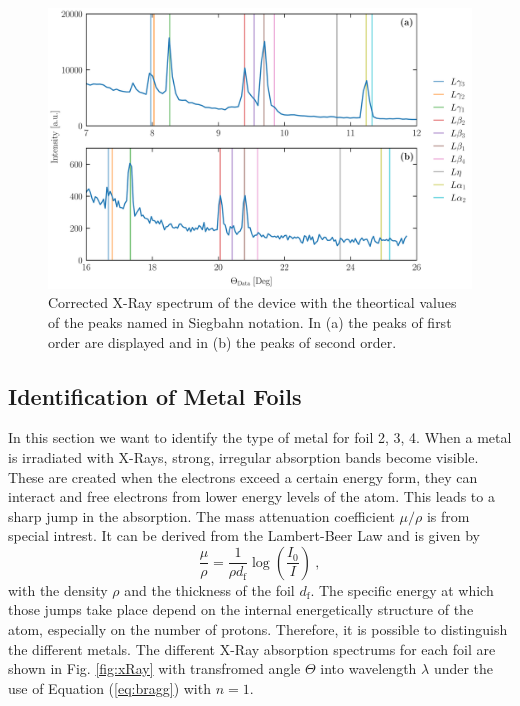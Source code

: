\begin{center}
    \begin{figure}
    \centering
    \includegraphics[width = 0.9\textheight]{Pictures/Evaluation/41/Wolfram-Spectrum.pdf}
    \caption{
        Corrected X-Ray spectrum of the device with the theortical values of the peaks named in Siegbahn notation. In (a) the peaks of first order are displayed and in (b) the peaks of second order.
    }
    \label{fig:wolfram}
    \end{figure}
\end{center}

\newpage

\subsection{Identification of Metal Foils}
\label{sub:identification}

In this section we want to identify the type of metal for foil 2, 3, 4. When a metal is irradiated with X-Rays, strong, irregular absorption bands become visible. These are created when the electrons exceed a certain energy form, they can interact and free electrons from lower energy levels of the atom. This leads to a sharp jump in the absorption. The mass attenuation coefficient $\mu/\rho$ is from special intrest. It can be derived from the Lambert-Beer Law and is given by
\begin{equation}
    \frac{\mu}{\rho} = \frac{1}{\rho d_\mathrm{f}}\log(\frac{I_0}{I})~,
\end{equation}
with the density $\rho$ and the thickness of the foil $d_\mathrm{f}$. The specific energy at which those jumps take place depend on the internal energetically structure of the atom, especially on the number of protons. Therefore, it is possible to distinguish the different metals. The different X-Ray absorption spectrums for each foil are shown in Fig. \ref{fig:xRay} with transfromed angle $\Theta$ into wavelength $\lambda$ under the use of Equation (\ref{eq:bragg}) with $n=1$. 

